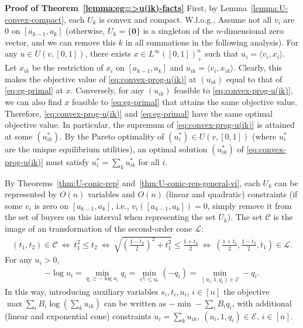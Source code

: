 \smallskip\noindent\textbf{Proof of Theorem~\ref{lemma:eg=>u(ik)-facts}}
First, by Lemma~\ref{lemma:U-convex-compact}, each $U_k$ is convex and compact. W.l.o.g., Assume not all $v_i$ are $0$ on $[a_{k-1}, a_k]$ (otherwise, $U_k = \{\mathbf{0}\}$ is a singleton of the $n$-dimensional zero vector, and we can remove this $k$ in all summations in the following analysis).
For any $u\in U(v, [0,1])$, there exists $x\in L^\infty([0,1])_+^n$ such that $u_i = \langle v_i, x_i\rangle$.  Let $x_{ik}$ be the restriction of $x_i$ on $[a_{k-1}, a_k]$ and $u_{ik} = \langle v_i, x_{ik}\rangle$. 
Clearly, this makes the objective value of \eqref{eq:convex-prog-u(ik)} at $(u_{ik})$ equal to that of \eqref{eq:eg-primal} at $x$. Conversely, for any $(u_{ik})$ feasible to \eqref{eq:convex-prog-u(ik)}, we can also find $x$ feasible to \eqref{eq:eg-primal} that attains the same objective value. Therefore, \eqref{eq:convex-prog-u(ik)} and \eqref{eq:eg-primal} have the same optimal objective value. 
In particular, the supremum of \eqref{eq:convex-prog-u(ik)} is attained at some $(u^*_{ik})$. 
By the Pareto optimality of $(u^*_i) \in U(v, [0,1])$ (where $u^*_i$ are the unique equilibrium utilities), an optimal solution $(u^*_{ik})$ of \eqref{eq:convex-prog-u(ik)} must satisfy $u^*_i = \sum_k u^*_{ik}$ for all $i$.

By Theorems~\ref{thm:U-conic-rep} and~\ref{thm:U-conic-rep-general-vi}, each $U_k$ can be represented by $O(n)$ variables and $O(n)$ (linear and quadratic) constraints (if some $v_i$ is zero on $[a_{k-1}, a_k]$, i.e., $v_i([a_{k-1}, a_k]) = 0$, simply remove it from the set of buyers on this interval when representing the set $U_k$). 
The set $\mathcal{C}$ is the image of an transformation of the second-order cone $\mathcal{L}$:
\begin{align*}
	(t_1, t_2) \in \mathcal{C} \ \Leftrightarrow \ t_1^2 \leq t_2 \ \Leftrightarrow \ \sqrt{\left(\frac{1-t_2}{2}\right)^2 + t_1^2} \leq \frac{1+t_2}{2} \ \Leftrightarrow \ \left( \frac{1+t_2}{2}, \frac{1-t_2}{2}, t_1 \right) \in \mathcal{L}.
\end{align*}
For any $u_i>0$,
\begin{align}
	- \log u_i = \min_{q_i\geq -\log u_i} q_i = \min_{e^{q_i} \leq u_i} (-q_i) = \min_{ (u_i, 1, q_i) \in \mathcal{E}} -q_i. \label{eq:log(ui)=>min(-qi)}
\end{align}
In this way, introducing auxiliary variables $s_i, t_i, u_i$, $i\in [n]$ the objective $\max \sum_i B_i \log \left( \sum_k u_{ik} \right)$ can be written as $-\min - \sum_i B_i q_i$, with additional (linear and exponential cone) constraints $u_i = \sum_k u_{ik}, \ 
(u_i, 1, q_i)\in \mathcal{E},\ i\in [n]$.


